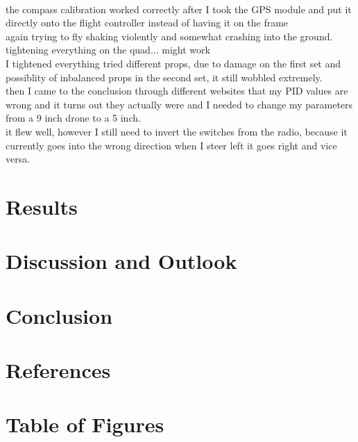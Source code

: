 \documentclass{article}
\newcommand{\comment}[1]{}
\begin{document}
	\\ the compass calibration worked correctly after I took the GPS module and put it directly onto the flight controller instead of having it on the frame
	\\ again trying to fly shaking violently and somewhat crashing into the ground.
	\\ tightening everything on the quad... might work
	\\ I tightened everything tried different props, due to damage on the first set and possiblity of inbalanced props in the second set, it still wobbled extremely. 
	\\ then I came to the conclusion through different websites that my PID values are wrong and it turns out they actually were and I needed to change my parameters from a 9 inch drone to a 5 inch.
	\\ it flew well, however I still need to invert the switches from the radio, because it currently goes into the wrong direction when I steer left it goes right and vice versa. 
	
	
	
	
	
	\section{Results}
	\section{Discussion and Outlook}
	\section{Conclusion}
	
	\section{References}
	\printbibliography[
	heading=bibintoc,
	title={Bibliography}
	]	
	\section{Table of Figures}
	\comment{(short table on which every figure description with the page number is listed)}
\end{document}
